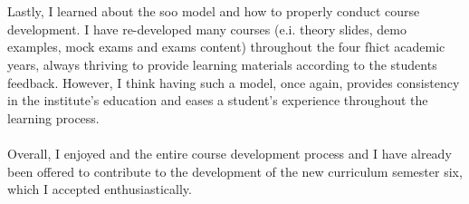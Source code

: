\\\\
Lastly, I learned about the \acrshort{soo} model and how to properly conduct course development. 
I have re-developed many courses (e.i. theory slides, demo examples, mock exams and exams content) throughout the four \acrshort{fhict} academic years, always thriving to provide learning materials according to the students feedback.
However, I think having such a model, once again, provides consistency in the institute's education and eases a student's experience throughout the learning process. 
\\\\
Overall, I enjoyed and the entire course development process and I have already been offered to contribute to the development of the new curriculum semester six, which I accepted enthusiastically.